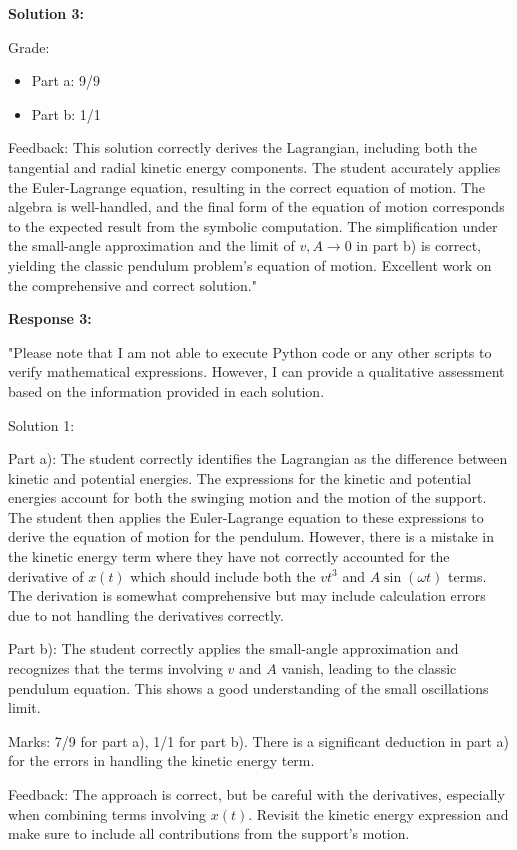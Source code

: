 \documentclass[a4paper,11pt]{article}
\begin{document}
\textbf{Solution 3:}

Grade:
\begin{itemize}
    \item Part a: 9/9
    \item Part b: 1/1
\end{itemize}

Feedback:
This solution correctly derives the Lagrangian, including both the tangential and radial kinetic energy components. The student accurately applies the Euler-Lagrange equation, resulting in the correct equation of motion. The algebra is well-handled, and the final form of the equation of motion corresponds to the expected result from the symbolic computation. The simplification under the small-angle approximation and the limit of \(v, A \rightarrow 0\) in part b) is correct, yielding the classic pendulum problem's equation of motion. Excellent work on the comprehensive and correct solution."

\textbf{Response 3:}

"Please note that I am not able to execute Python code or any other scripts to verify mathematical expressions. However, I can provide a qualitative assessment based on the information provided in each solution.

Solution 1:

Part a): The student correctly identifies the Lagrangian as the difference between kinetic and potential energies. The expressions for the kinetic and potential energies account for both the swinging motion and the motion of the support. The student then applies the Euler-Lagrange equation to these expressions to derive the equation of motion for the pendulum. However, there is a mistake in the kinetic energy term where they have not correctly accounted for the derivative of \(x(t)\) which should include both the \(vt^3\) and \(A\sin(\omega t)\) terms. The derivation is somewhat comprehensive but may include calculation errors due to not handling the derivatives correctly.

Part b): The student correctly applies the small-angle approximation and recognizes that the terms involving \(v\) and \(A\) vanish, leading to the classic pendulum equation. This shows a good understanding of the small oscillations limit.

Marks: 7/9 for part a), 1/1 for part b). There is a significant deduction in part a) for the errors in handling the kinetic energy term.

Feedback: The approach is correct, but be careful with the derivatives, especially when combining terms involving \(x(t)\). Revisit the kinetic energy expression and make sure to include all contributions from the support's motion.
\end{document}
